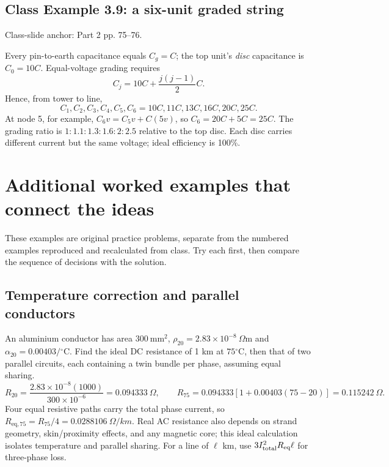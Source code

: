 \documentclass[11pt,a4paper]{article}
\newcommand{\slides}[1]{{\small\color{muted}\textsf{Class-slide anchor: #1.}}\par}
\newcommand{\chapterstart}[2]{\clearpage\section{#1}\label{#2}}
\newcommand{\ans}[1]{\boxed{#1}}
\begin{document}
\subsection{Class Example 3.9: a six-unit graded string}
\slides{Part 2 pp. 75--76}
Every pin-to-earth capacitance equals $C_g=C$; the top unit's \emph{disc} capacitance is $C_0=10C$. Equal-voltage grading requires
\[
 C_j=10C+\frac{j(j-1)}2C.
\]
Hence, from tower to line,
\[
 \ans{C_1,C_2,C_3,C_4,C_5,C_6=10C,11C,13C,16C,20C,25C}.
\]
At node 5, for example, $C_6v=C_5v+C(5v)$, so $C_6=20C+5C=25C$. The grading ratio is $1:1.1:1.3:1.6:2:2.5$ relative to the top disc. Each disc carries different current but the same voltage; ideal efficiency is 100\%.

\chapterstart{Additional worked examples that connect the ideas}{extraexamples}
These examples are original practice problems, separate from the numbered examples reproduced and recalculated from class. Try each first, then compare the sequence of decisions with the solution.
\subsection{Temperature correction and parallel conductors}
An aluminium conductor has area $300\ \mathrm{mm^2}$, $\rho_{20}=2.83\times10^{-8}\ \Omega\mathrm m$ and $\alpha_{20}=0.00403/{}^\circ\mathrm C$. Find the ideal DC resistance of 1 km at $75{}^\circ\mathrm C$, then that of two parallel circuits, each containing a twin bundle per phase, assuming equal sharing.
\[
 R_{20}=\frac{2.83\times10^{-8}(1000)}{300\times10^{-6}}=0.094333\ \Omega,\qquad
 R_{75}=0.094333[1+0.00403(75-20)]=\ans{0.115242\ \Omega}.
\]
Four equal resistive paths carry the total phase current, so $R_{\mathrm{eq},75}=R_{75}/4=\ans{0.0288106\ \Omega/km}$. Real AC resistance also depends on strand geometry, skin/proximity effects, and any magnetic core; this ideal calculation isolates temperature and parallel sharing. For a line of $\ell$ km, use $3I_{\rm total}^2R_{\rm eq}\ell$ for three-phase loss.
\end{document}
